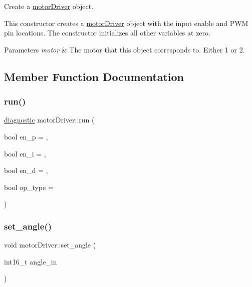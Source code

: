 Create a \mbox{\hyperlink{classmotorDriver}{motor\+Driver}} object. 

This constructor creates a \mbox{\hyperlink{classmotorDriver}{motor\+Driver}} object with the input enable and P\+WM pin locations. The constructor initializes all other variables at zero. 
\begin{DoxyParams}{Parameters}
{\em motor} & The motor that this object corresponds to. Either \textquotesingle{}1\textquotesingle{} or \textquotesingle{}2\textquotesingle{}. \\
\hline
\end{DoxyParams}


\subsection{Member Function Documentation}
\mbox{\label{classmotorDriver_a49437362ce00be4bd428d4e7e46fd477}} 
\subsubsection{\texorpdfstring{run()}{run()}}
{\footnotesize\ttfamily \mbox{\hyperlink{structdiagnostic}{diagnostic}} motor\+Driver\+::run (\begin{DoxyParamCaption}\item[{bool}]{en\+\_\+p = {},  }\item[{bool}]{en\+\_\+i = {},  }\item[{bool}]{en\+\_\+d = {},  }\item[{bool}]{op\+\_\+type = {} }\end{DoxyParamCaption})}

\mbox{\label{classmotorDriver_aed116408f7a7498a96a69dc5b14930aa}} 
\subsubsection{\texorpdfstring{set\_angle()}{set\_angle()}}
{\footnotesize\ttfamily void motor\+Driver\+::set\+\_\+angle (\begin{DoxyParamCaption}\item[{int16\+\_\+t}]{angle\+\_\+in }\end{DoxyParamCaption})}

